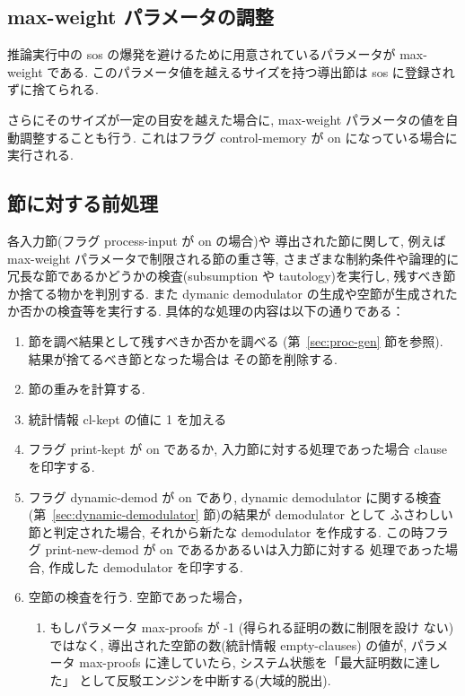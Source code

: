 \subsection{max-weight パラメータの調整}
\label{sec:pn-control-memory}

推論実行中の sos の爆発を避けるために用意されているパラメータが
max-weight である. このパラメータ値を越えるサイズを持つ導出節は
sos に登録されずに捨てられる. 

さらにそのサイズが一定の目安を越えた場合に, max-weight 
パラメータの値を自動調整することも行う. 
これはフラグ control-memory が on になっている場合に実行される.

\subsection{節に対する前処理}
\label{sec:pre-process}

各入力節(フラグ process-input が on の場合)や
導出された節に関して, 
例えば max-weight パラメータで制限される節の重さ等, 
さまざまな制約条件や論理的に冗長な節であるかどうかの検査(subsumption
や tautology)を実行し, 残すべき節か捨てる物かを判別する.
また dymanic demodulator の生成や空節が生成されたか否かの検査等を実行する.
具体的な処理の内容は以下の通りである：

\begin{enumerate}
\item 節を調べ結果として残すべきか否かを調べる
  (第~\ref{sec:proc-gen} 節を参照).
  結果が捨てるべき節となった場合は
  その節を削除する.
\item 節の重みを計算する.
\item 統計情報 cl-kept の値に 1 を加える
\item フラグ print-kept が on であるか, 入力節に対する処理であった場合
  clause を印字する.
\item フラグ dynamic-demod が on であり, dynamic demodulator に関する検査
  (第~\ref{sec:dynamic-demodulator} 節)の結果が demodulator として
  ふさわしい節と判定された場合, それから新たな demodulator を作成する.
  この時フラグ print-new-demod が on であるかあるいは入力節に対する
  処理であった場合, 作成した demodulator を印字する.
\item 空節の検査を行う.
  空節であった場合，
  \begin{enumerate}
  \item もしパラメータ max-proofs が -1 (得られる証明の数に制限を設け
    ない)ではなく,
    導出された空節の数(統計情報 empty-clauses) の値が, パラメータ
    max-proofs に達していたら, システム状態を「最大証明数に達した」
    として反駁エンジンを中断する(大域的脱出). 
  \end{enumerate}
\end{enumerate}

